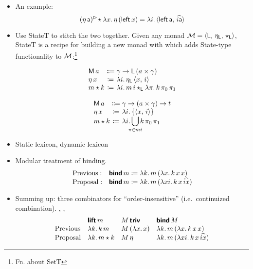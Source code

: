 \begin{itemize}
	\item An example:
	\[(\eta\,\textsf{a})^\rhd\! \star \lambda x.\,\eta\,(\textsf{left}\,x) = \lambda i.\,\langle \textsf{left}\,\textsf{a},\,\widehat{i\textsf{a}} \rangle\]%
	
	\item Use StateT to stitch the two together. Given any monad ${\cal M}= \langle \textsf{L},\,\eta_\textsf{L},\,\star_\textsf{L} \rangle$, StateT is a recipe for building a new monad with which adds State-type functionality to ${\cal M}$:\footnote{Fn. about SetT}%
	\begin{defi}\label{statet}
		\[\begin{array}[t]
			{@{}l@{}c@{}l@{}}
			\textsf{M}\,a &{}\Coloneqq{} &\gamma \ra \textsf{L}\,(a \times \gamma)%
			\\
			\eta\,x &{}\ceq{} &\lambda i .\,\eta_\textsf{L}\,\ab{x,\,i}
			\\
			m \star k &{}\ceq{} &\lambda i.\, m\,i\star_\textsf{L} \lambda \pi.\,k\,\pi_0\,\pi_1%
		\end{array}\]
	\end{defi}
	\begin{defi}\label{stateset}
		\[\begin{array}[t]
			{@{}l@{}c@{}l@{}}
			\textsf{M}\,a &{}\Coloneqq{} &\gamma \ra (a \times \gamma) \ra t%
			\\
			\eta\,x &{}\ceq{} &\lambda i.\left\{\ab{x,\,i}\right\}
			\\
			m \star k &{}\ceq{} &\lambda i.\displaystyle\bigcup_{\mathclap{\pi \in mi}}k\,\pi_0\,\pi_1%
		\end{array}\]
	\end{defi}
	

	\item Static lexicon, dynamic lexicon
	
	\item Modular treatment of binding.%
	\[\begin{array}{ll}
		\text{Previous}:& \bsf{bind}\,m \ceq \lambda k.\,m\,(\lambda x.\,k\,x\,x)%
		\\
		\text{Proposal}:& \bsf{bind}\,m \ceq \lambda k.\,m\,(\lambda xi.\,k\,x\,\widehat{ix})%
	\end{array}\]
	
	\item Summing up: three combinators for ``order-insensitive'' (i.e.~continuized combination). , , %
	\[\begin{array}{lllll}
		& \bsf{lift}\,m & M\,\bsf{triv} & \bsf{bind}\,M %
		\\
		\text{Previous} & \lambda k.\,k\,m & M\,(\lambda x.\,x) & \lambda k.\,m\,(\lambda x.\,k\,x\,x)%
		\\
		\text{Proposal} & \lambda k.\,m \star k & M\,\eta & \lambda k.\,m\,(\lambda xi.\,k\,x\,\widehat{ix})%
	\end{array}\]
\end{itemize}

